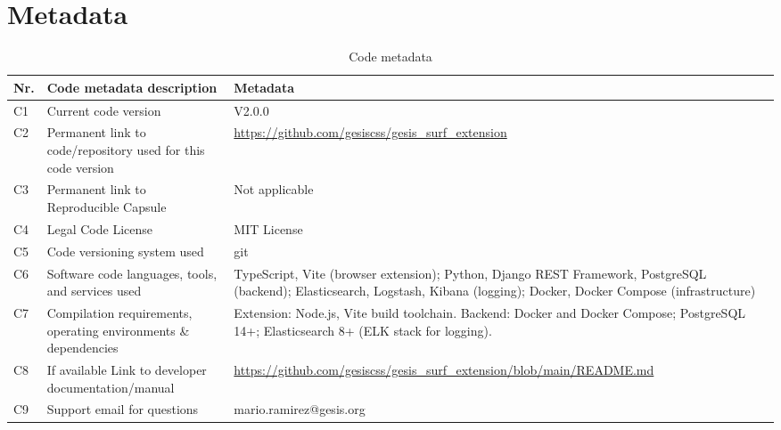 \documentclass[preprint,12pt,a4paper]{elsarticle}
\begin{document}
  \section*{Metadata}

  \begin{table}[!h]
    \begin{tabular}{|l|p{5.8cm}|p{5.8cm}|}
      \hline
      \textbf{Nr.} & \textbf{Code metadata description}                               & \textbf{Metadata}                                                                                                                                                                                                                                                                                       \\
      \hline
      C1           & Current code version                                             & V2.0.0                                                                                                                                                                                                                                                                                                                    \\
      \hline
      C2           & Permanent link to code/repository used for this code version     & \url{https://github.com/gesiscss/gesis_surf_extension}            \\
      \hline
      C3           & Permanent link to Reproducible Capsule                           & Not applicable                                                    \\
      \hline
      C4           & Legal Code License                                               & MIT License                                                       \\
      \hline
      C5           & Code versioning system used                                      & git                                                               \\
      \hline
      C6           & Software code languages, tools, and services used                & TypeScript, Vite (browser extension); Python, Django REST Framework, PostgreSQL (backend); Elasticsearch, Logstash, Kibana (logging); Docker, Docker Compose (infrastructure) \\
      \hline
      C7           & Compilation requirements, operating environments \& dependencies & Extension: Node.js, Vite build toolchain. Backend: Docker and Docker Compose; PostgreSQL 14+; Elasticsearch 8+ (ELK stack for logging). \\
      \hline
      C8           & If available Link to developer documentation/manual              & \url{https://github.com/gesiscss/gesis_surf_extension/blob/main/README.md} \\
      \hline
      C9           & Support email for questions                                      & mario.ramirez@gesis.org                                           \\
      \hline
    \end{tabular}
    \caption{Code metadata}
    \label{codeMetadata}
  \end{table}
\end{document}
